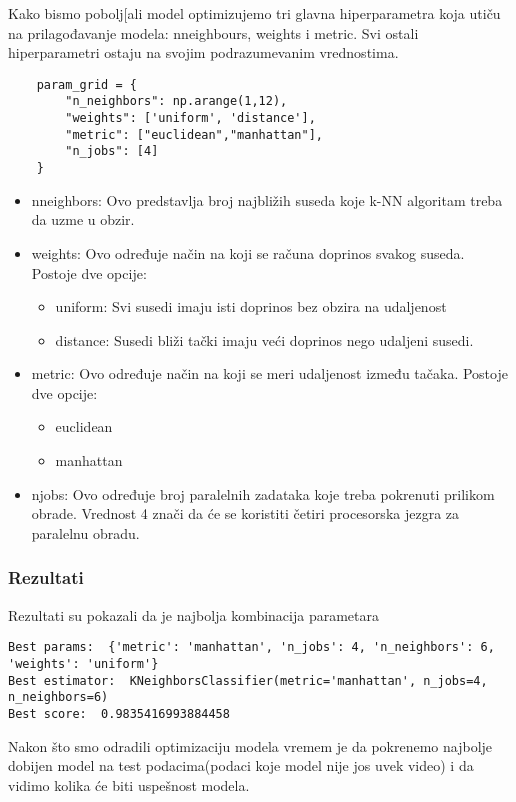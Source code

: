 \documentclass[a4paper,12pt]{article}
\begin{document}
Kako bismo pobolj[ali model optimizujemo tri glavna hiperparametra koja utiču na prilagođavanje modela: n\textunderscore neighbours, weights i metric. Svi ostali hiperparametri ostaju na svojim podrazumevanim vrednostima.
\begin{verbatim}
    param_grid = {
        "n_neighbors": np.arange(1,12),
        "weights": ['uniform', 'distance'],
        "metric": ["euclidean","manhattan"],
        "n_jobs": [4]
    }
\end{verbatim}
\begin{itemize}
    \item n\textunderscore neighbors: Ovo predstavlja broj najbližih suseda koje k-NN algoritam treba da uzme u obzir.
    \item weights: Ovo određuje način na koji se računa doprinos svakog suseda. Postoje dve opcije:
    \begin{itemize}
        \item uniform: Svi susedi imaju isti doprinos bez obzira na udaljenost
        \item distance: Susedi bliži tački imaju veći doprinos nego udaljeni susedi.
    \end{itemize}
    \item metric: Ovo određuje način na koji se meri udaljenost između tačaka. Postoje dve opcije:
    \begin{itemize}
        \item euclidean
        \item manhattan
    \end{itemize}
    \item n\textunderscore jobs: Ovo određuje broj paralelnih zadataka koje treba pokrenuti prilikom obrade. Vrednost 4 znači da će se koristiti četiri procesorska jezgra za paralelnu obradu.

\end{itemize}
\subsubsection{Rezultati}
Rezultati su pokazali da je najbolja kombinacija parametara
\begin{verbatim}
Best params:  {'metric': 'manhattan', 'n_jobs': 4, 'n_neighbors': 6, 'weights': 'uniform'}
Best estimator:  KNeighborsClassifier(metric='manhattan', n_jobs=4, n_neighbors=6)
Best score:  0.9835416993884458
\end{verbatim}

Nakon što smo odradili optimizaciju modela vremem je da pokrenemo najbolje dobijen model na test podacima(podaci koje model nije jos uvek video) i da vidimo kolika će biti uspešnost modela.
\end{document}

